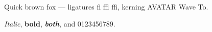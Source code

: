 \documentclass[border=3pt]{standalone}
\begin{document}
Quick brown fox --- ligatures fi ffl ffi, kerning AVATAR Wave To.

\textit{Italic}, \textbf{bold}, \textbf{\textit{both}}, and 0123456789.
\end{document}
